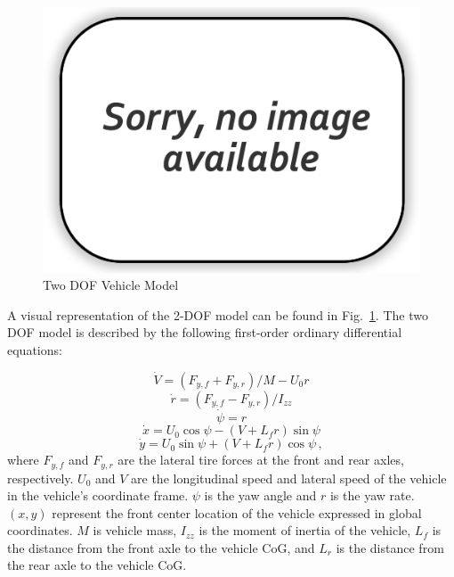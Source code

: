 \documentclass[12pt,twocolumn]{article}
\begin{document}
\begin{figure}
	\centering
	\includegraphics[width=\columnwidth]{Figs/no-image.png}
	\caption{\small Two DOF Vehicle Model}  
	\label{fig:2DOF}
\end{figure}

A visual representation of the 2-DOF model can be found in Fig.~\ref{fig:2DOF}. The two DOF model is described by the following first-order ordinary differential equations:

\begin{equation}\label{e:2DOF_Vdot}
\dot{V} = \left(F_{y,f} + F_{y,r}\right)/{M - U_0r} 
\end{equation}
\begin{equation}\label{e:2DOF_rdot}
\dot{r} = \left(F_{y,f} - F_{y,r}\right)/I_{zz}
\end{equation}
\begin{equation}\label{e:2DOF_psidot}
\dot{\psi} = r 
\end{equation}
\begin{equation}\label{e:2DOF_xdot}
\dot{x} = U_0\cos{\psi}-\left(V+L_fr\right)\sin{\psi}
\end{equation}
\begin{equation}\label{e:2DOF_ydot}
\dot{y} = U_0\sin{\psi}+\left(V+L_fr\right)\cos{\psi} \,,
\end{equation}
%
where $F_{y,f}$ and $F_{y,r}$ are the lateral tire forces at the front and rear axles, respectively. $U_0$ and $V$ are the longitudinal speed and lateral speed of the vehicle in the vehicle’s coordinate frame. $\psi$ is the yaw angle and $r$ is the yaw rate. $\left(x,y\right)$ represent the front center location of the vehicle expressed in global coordinates. $M$ is vehicle mass, $I_{zz}$ is the moment of inertia of the vehicle, $L_f$ is the distance from the front axle to the vehicle CoG, and $L_r$ is the distance from the rear axle to the vehicle CoG.
\end{document}
